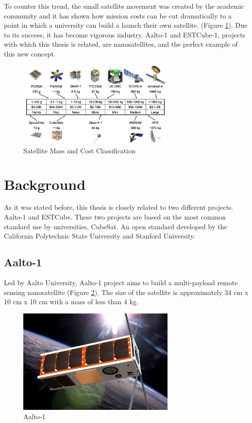 To counter this trend, the small satellite movement was created by the academic community and it has shown how mission costs can be cut dramatically to a point in which a university can build a launch their own satellite. (Figure \ref{f1.3}). Due to its success, it has become vigorous industry. Aalto-1 and ESTCube-1, projects with which this thesis is related, are nanosatellites, and the perfect example of this new concept.\\

\begin{figure}[H]
\centerline{\includegraphics[width=0.7\textwidth]{images/satclass.png}}
\caption{Satellite Mass and Cost Classification \cite{BARN}}
\label{f1.3}
\end{figure}

\section{Background}\label{1.1}

As it was stated before, this thesis is closely related to two different projects. Aalto-1 and ESTCube. These two projects are based on the most common standard use by universities, CubeSat\cite{CubeSat}. An open standard developed by the California Polytechnic State University and Stanford University.

\subsection{Aalto-1}

Led by Aalto University, Aalto-1 project aims to build a multi-payload remote sensing nanosatellite (Figure \ref{f1.4}). The size of the satellite is approximately 34 cm x 10 cm x 10 cm with a mass of less than 4 kg\cite{AALTO1a}.

\begin{figure}[H]
\centerline{\includegraphics[width=0.7\textwidth]{images/aalto1.png}}
\caption{Aalto-1}
\label{f1.4}
\end{figure}



